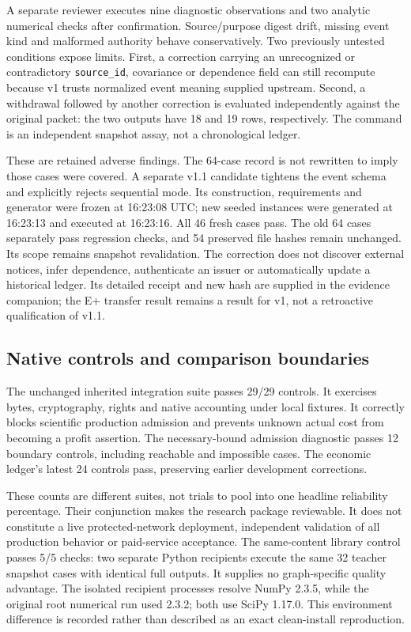 A separate reviewer executes nine diagnostic observations and two analytic numerical checks after confirmation. Source/purpose digest drift, missing event kind and malformed authority behave conservatively. Two previously untested conditions expose limits. First, a correction carrying an unrecognized or contradictory \texttt{source\_id}, covariance or dependence field can still recompute because v1 trusts normalized event meaning supplied upstream. Second, a withdrawal followed by another correction is evaluated independently against the original packet: the two outputs have 18 and 19 rows, respectively. The command is an independent snapshot assay, not a chronological ledger.

These are retained adverse findings. The 64-case record is not rewritten to imply those cases were covered. A separate v1.1 candidate tightens the event schema and explicitly rejects sequential mode. Its construction, requirements and generator were frozen at 16:23:08 UTC; new seeded instances were generated at 16:23:13 and executed at 16:23:16. All 46 fresh cases pass. The old 64 cases separately pass regression checks, and 54 preserved file hashes remain unchanged. Its scope remains snapshot revalidation. The correction does not discover external notices, infer dependence, authenticate an issuer or automatically update a historical ledger. Its detailed receipt and new hash are supplied in the evidence companion; the E+ transfer result remains a result for v1, not a retroactive qualification of v1.1.

\subsection{Native controls and comparison boundaries}

The unchanged inherited integration suite passes 29/29 controls. It exercises bytes, cryptography, rights and native accounting under local fixtures. It correctly blocks scientific production admission and prevents unknown actual cost from becoming a profit assertion. The necessary-bound admission diagnostic passes 12 boundary controls, including reachable and impossible cases. The economic ledger's latest 24 controls pass, preserving earlier development corrections.

These counts are different suites, not trials to pool into one headline reliability percentage. Their conjunction makes the research package reviewable. It does not constitute a live protected-network deployment, independent validation of all production behavior or paid-service acceptance. The same-content library control passes 5/5 checks: two separate Python recipients execute the same 32 teacher snapshot cases with identical full outputs. It supplies no graph-specific quality advantage. The isolated recipient processes resolve NumPy 2.3.5, while the original root numerical run used 2.3.2; both use SciPy 1.17.0. This environment difference is recorded rather than described as an exact clean-install reproduction.

